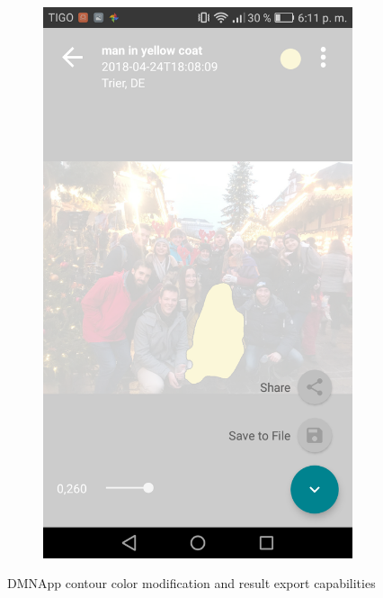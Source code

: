 \begin{figure}[!htbp]
\begin{multicols}{3}
    \begin{subfigure}[b]{\columnwidth}
            \centering
            \includegraphics[width=\textwidth]{./figures/dmn_app/views/14.png}
    \label{subfig:export}
    \end{subfigure}
    \end{multicols}
    \caption{DMNApp contour color modification and result export capabilities}
    \label{Fig:Vis_Color}
\end{figure}

